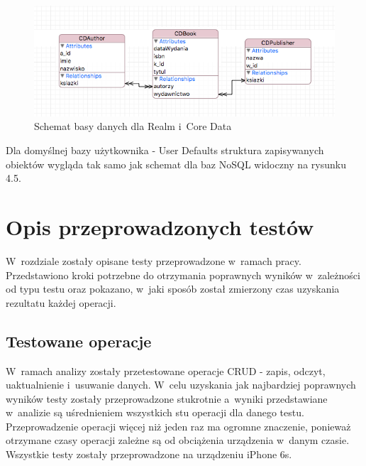 \begin{figure}[h]
\centering
	\includegraphics[width=\linewidth]{img/database/document-sheme.png}
	\caption{Schemat basy danych dla Realm i~Core Data}
	\label{fig: nosql_data_scheme}
\end{figure}

Dla domyślnej bazy użytkownika - User Defaults struktura zapisywanych obiektów wygląda tak samo jak schemat dla baz NoSQL widoczny na rysunku 4.5. \par 

\section{Opis przeprowadzonych testów}

 W~rozdziale zostały opisane testy przeprowadzone w~ramach pracy. Przedstawiono kroki potrzebne do otrzymania poprawnych wyników w~zależności od typu testu oraz pokazano, w~jaki sposób został zmierzony czas uzyskania rezultatu każdej operacji. 

\subsection{Testowane operacje}

 W~ramach analizy zostały przetestowane operacje CRUD - zapis, odczyt, uaktualnienie i~usuwanie danych. W~celu uzyskania jak najbardziej poprawnych wyników testy zostały przeprowadzone stukrotnie a~wyniki przedstawiane w~analizie są uśrednieniem wszystkich stu operacji dla danego testu. Przeprowadzenie operacji więcej niż jeden raz ma ogromne znaczenie, ponieważ otrzymane czasy operacji zależne są od obciążenia urządzenia w~danym czasie. Wszystkie testy zostały przeprowadzone na  urządzeniu iPhone 6s. \par

